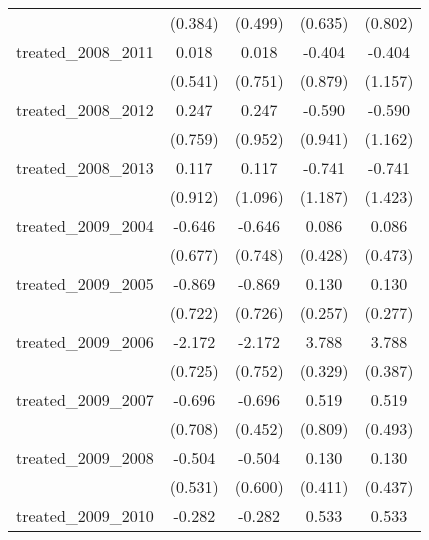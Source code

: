{\begin{tabular}{l*{4}{c}}
            &     (0.384)         &     (0.499)         &     (0.635)         &     (0.802)         \\
[1em]
treated\_2008\_2011&       0.018         &       0.018         &      -0.404         &      -0.404         \\
            &     (0.541)         &     (0.751)         &     (0.879)         &     (1.157)         \\
[1em]
treated\_2008\_2012&       0.247         &       0.247         &      -0.590         &      -0.590         \\
            &     (0.759)         &     (0.952)         &     (0.941)         &     (1.162)         \\
[1em]
treated\_2008\_2013&       0.117         &       0.117         &      -0.741         &      -0.741         \\
            &     (0.912)         &     (1.096)         &     (1.187)         &     (1.423)         \\
[1em]
treated\_2009\_2004&      -0.646         &      -0.646         &       0.086         &       0.086         \\
            &     (0.677)         &     (0.748)         &     (0.428)         &     (0.473)         \\
[1em]
treated\_2009\_2005&      -0.869         &      -0.869         &       0.130         &       0.130         \\
            &     (0.722)         &     (0.726)         &     (0.257)         &     (0.277)         \\
[1em]
treated\_2009\_2006&      -2.172\sym{**} &      -2.172\sym{**} &       3.788\sym{***}&       3.788\sym{***}\\
            &     (0.725)         &     (0.752)         &     (0.329)         &     (0.387)         \\
[1em]
treated\_2009\_2007&      -0.696         &      -0.696         &       0.519         &       0.519         \\
            &     (0.708)         &     (0.452)         &     (0.809)         &     (0.493)         \\
[1em]
treated\_2009\_2008&      -0.504         &      -0.504         &       0.130         &       0.130         \\
            &     (0.531)         &     (0.600)         &     (0.411)         &     (0.437)         \\
[1em]
treated\_2009\_2010&      -0.282         &      -0.282\sym{*}  &       0.533         &       0.533         \\

\end{tabular}}
